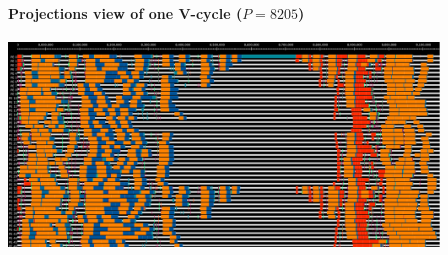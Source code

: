 \begin{frame}[fragile,label=ss-recent-gravity] 
\secframetitle{\ssRecentGravity}
\framesubtitle{Projections view of one V-cycle ($P=8205$)}
  \begin{center}
    \vspace{-0.1in}
    \begin{minipage}{4.5in}
          \includegraphics[width=4.5in]{mg0-vcycle-new-2.pdf}
    \end{minipage}
  \end{center}
\end{frame}
% 
%
%
%
%
%        
%
%
